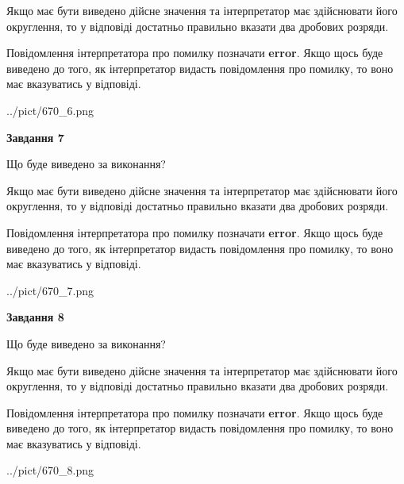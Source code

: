 \documentclass[12pt, ukrainian]{article}
\begin{document}
{\begin {Large}
Якщо має бути виведено дійсне значення та інтерпретатор має здійснювати його округлення, 
то у відповіді достатньо правильно вказати два дробових розряди.

Повідомлення інтерпретатора про помилку позначати \textbf{error}.
Якщо щось буде виведено до того, як інтерпретатор видасть повідомлення про помилку, 
то воно має вказуватись у відповіді. \par

\begin{center}
	{../pict/670_6.png}
\end{center}
\newpage

{\begin {center}\textbf{Завдання 7}\end {center}}\par
Що буде виведено за виконання? \par

Якщо має бути виведено дійсне значення та інтерпретатор має здійснювати його округлення, 
то у відповіді достатньо правильно вказати два дробових розряди.

Повідомлення інтерпретатора про помилку позначати \textbf{error}.
Якщо щось буде виведено до того, як інтерпретатор видасть повідомлення про помилку, 
то воно має вказуватись у відповіді. \par

\begin{center}
	{../pict/670_7.png}
\end{center}
\newpage

{\begin {center}\textbf{Завдання 8}\end {center}}\par
Що буде виведено за виконання? \par

Якщо має бути виведено дійсне значення та інтерпретатор має здійснювати його округлення, 
то у відповіді достатньо правильно вказати два дробових розряди.

Повідомлення інтерпретатора про помилку позначати \textbf{error}.
Якщо щось буде виведено до того, як інтерпретатор видасть повідомлення про помилку, 
то воно має вказуватись у відповіді. \par

\begin{center}
	{../pict/670_8.png}
\end{center}
\newpage


\end{Large}}
\end{document}

